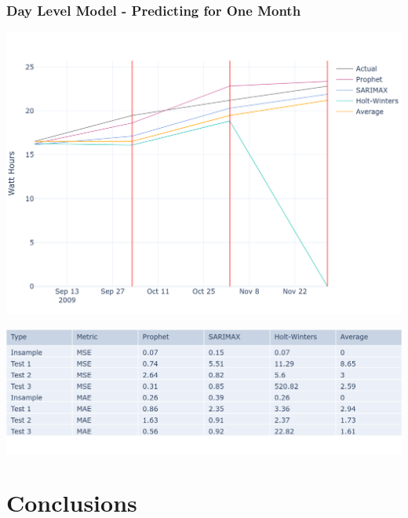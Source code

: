 \documentclass[10pt]{beamer}
\begin{document}
\begin{frame}
\frametitle{Day Level Model - Predicting for One Month}

\bigskip
{
    \centering
    \includegraphics[width=\textwidth,height=\textheight,keepaspectratio]{model_comparison_timeseries_daymodel_months.png}
    \par
}
\bigskip

\bigskip
{
    \centering
    \includegraphics[width=\textwidth,height=\textheight,keepaspectratio]{model_comparison_table_daymodel_months.png}
    \par
}
\bigskip


\end{frame}

\section{Conclusions}
\end{document}
